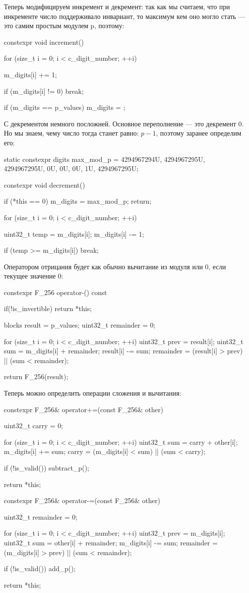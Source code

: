 Теперь модифицируем инкремент и декремент: так как мы считаем, что при инкременте число поддерживало инвариант, то максимум кем оно могло стать --- это самим простым модулем p, поэтому:
\begin{cppcode}
constexpr void increment() {
    for (size_t i = 0; i < c_digit_number; ++i) {
        m_digits[i] += 1;

        if (m_digits[i] != 0) {
            break;
        }
    }

    if (m_digits == p_values) {
        m_digits = {};
    }
}
\end{cppcode}
С декрементом немного посложней. Основное переполнение --- это декремент 0. Но мы знаем, чему число тогда станет равно: $p-1$, поэтому заранее определим его:
\begin{cppcode}
static constexpr digits max_mod_p = {4294967294U, 4294967295U, 4294967295U, 0U, 0U, 0U, 1U, 4294967295U};

constexpr void decrement() {
    if (*this == 0) {
        m_digits = max_mod_p;
        return;
    }

    for (size_t i = 0; i < c_digit_number; ++i) {
        uint32_t temp = m_digits[i];
        m_digits[i] -= 1;

        if (temp >= m_digits[i]) {
            break;
        }
    }
}
\end{cppcode}
Оператором отрицания будет как обычно вычитание из модуля или 0, если текущее значение 0:
\begin{cppcode}
constexpr F_256 operator-() const {
    if(!is_invertible) {
        return *this;
    }

    blocks result = p_values;
    uint32_t remainder = 0;

    for (size_t i = 0; i < c_digit_number; ++i) {
        uint32_t prev = result[i];
        uint32_t sum = m_digits[i] + remainder;
        result[i] -= sum;
        remainder = (result[i] > prev) || (sum < remainder);
    }

    return F_256(result);
}
\end{cppcode}
Теперь можно определить операции сложения и вычитания:
\begin{cppcode}
constexpr F_256& operator+=(const F_256& other) {
    uint32_t carry = 0;

    for (size_t i = 0; i < c_digit_number; ++i) {
        uint32_t sum = carry + other[i];
        m_digits[i] += sum;
        carry = (m_digits[i] < sum) || (sum < carry);
    }

    if (!is_valid()) {
        subtract_p();
    }

    return *this;
}

constexpr F_256& operator-=(const F_256& other) {
    uint32_t remainder = 0;

    for (size_t i = 0; i < c_digit_number; ++i) {
        uint32_t prev = m_digits[i];
        uint32_t sum = other[i] + remainder;
        m_digits[i] -= sum;
        remainder = (m_digits[i] > prev) || (sum < remainder);
    }

    if (!is_valid()) {
        add_p();
    }

    return *this;
}
\end{cppcode}
